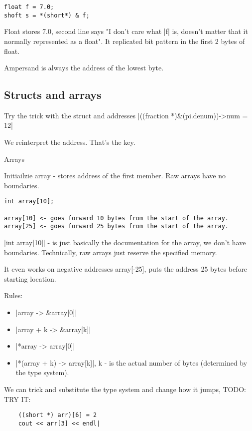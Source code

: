\begin{lstlisting}
float f = 7.0;
shoft s = *(short*) & f;
\end{lstlisting}

Float stores 7.0, second line says "I don't care what |f| is, doesn't matter
that it normally represented as a float". It replicated bit pattern in the
first 2 bytes of float.

Ampersand is always the address of the lowest byte.

\subsection{Structs and arrays}

Try the trick with the struct and addresses |((fraction *)&(pi.denum))->num = 12|

We reinterpret the address. That's the key.

Arrays

Initiailzie array - stores address of the first member. Raw arrays have no boundaries.

\begin{lstlisting}
int array[10];

array[10] <- goes forward 10 bytes from the start of the array.
array[25] <- goes forward 25 bytes from the start of the array.
\end{lstlisting}

|int array[10]| - is just basically the documentation for the array, we don't
have boundaries. Technically, raw arrays just reserve the specified memory.

It even works on negative addresses array[-25], puts the address 25 bytes
before starting location.

Rules:
\begin{itemize}
    \item |array -> &array[0]|
    \item |array + k -> &array[k]|
    \item |*array -> array[0]|
    \item |*(array + k) -> array[k]|, k - is the actual number of bytes (determined by the type system).
\end{itemize}

We can trick and substitute the type system and change how it jumps, TODO: TRY IT:
\begin{lstlisting}
    ((short *) arr)[6] = 2
    cout << arr[3] << endl|
\end{lstlisting}


